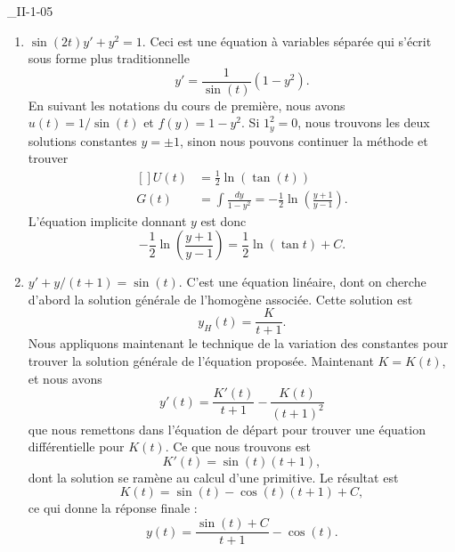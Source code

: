 

\begin{corrige}{_II-1-05}

\begin{enumerate}

	\item $\sin(2t)y'+y^2=1$. 
Ceci est une équation à variables séparée qui s'écrit sous forme plus traditionnelle
\begin{equation}
	y'=\frac{1}{ \sin(t) }(1-y^2).
\end{equation}
En suivant les notations du cours de première, nous avons $u(t)=1/\sin(t)$ et $f(y)=1-y^2$. Si $1_y^2=0$, nous trouvons les deux solutions constantes $y=\pm 1$, sinon nous pouvons continuer la méthode et trouver
\begin{equation}
	\begin{aligned}[]
		U(t)	&=\frac{ 1 }{2}\ln(\tan(t))\\
		G(t)	&=\int\frac{ dy }{ 1-y^2 }=-\frac{ 1 }{2}\ln\left( \frac{ y+1 }{ y-1 } \right).
	\end{aligned}
\end{equation}
L'équation implicite donnant $y$ est donc
\begin{equation}
	-\frac{ 1 }{2}\ln\left( \frac{ y+1 }{ y-1 } \right)=\frac{ 1 }{2}\ln(\tan t)+C.
\end{equation}

	\item $y'+y/(t+1)=\sin(t)$. 
C'est une équation linéaire, dont on cherche d'abord la solution générale de l'homogène associée. Cette solution est
\begin{equation}
	y_H(t)=\frac{ K }{ t+1 }.
\end{equation}
Nous appliquons maintenant le technique de la variation des constantes pour trouver la solution générale de l'équation proposée. Maintenant $K=K(t)$, et nous avons
\begin{equation}
	y'(t)=\frac{ K'(t) }{ t+1 }-\frac{ K(t) }{ (t+1)^2 }
\end{equation}
que nous remettons dans l'équation de départ pour trouver une équation différentielle pour $K(t)$. Ce que nous trouvons est
\begin{equation}
	K'(t)=\sin(t)(t+1),
\end{equation}
dont la solution se ramène au calcul d'une primitive. Le résultat est
\begin{equation}
	K(t)=\sin(t)-\cos(t)(t+1)+C,
\end{equation}
ce qui donne la réponse finale :
\begin{equation}
	y(t)=\frac{ \sin(t)+C }{ t+1 }-\cos(t).
\end{equation}


\end{enumerate}
\end{corrige}
